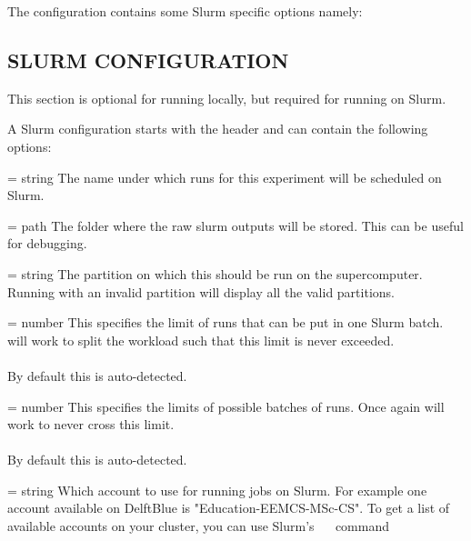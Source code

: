 \documentclass[a4paper,english]{article}
\begin{document}
\begin{adjustwidth}{18pt}{0pt}
      The configuration contains some Slurm specific options namely:

      \subsection{SLURM CONFIGURATION}

          This section is optional for running locally, but required
          for running on Slurm.

          A Slurm configuration starts with the header \Arg{[slurm]}
          and can contain the following options:

          \begin{Description}[Options]\setlength{\itemsep}{0cm}
              \item[\Opt{experiment\_name} = string]
                The name under which runs for this experiment will be scheduled
                on Slurm.
              \item[\Opt{output\_folder} = path]
                The folder where the raw slurm outputs will be stored.
                This can be useful for debugging.
              \item[\Opt{partition} = string]
                The partition on which this should be run on the supercomputer.
                Running    with an invalid partition
                will display all the valid partitions.
              \item[\Opt{array\_size\_limit?} = number]
                This specifies the limit of runs that can be put in one Slurm batch.
                 will work to split the workload such that this limit
                is never exceeded. \\ \\
                By default this is auto-detected.
              \item[\Opt{max\_submit?} = number]
                This specifies the limits of possible batches of runs.
                Once again  will work to never cross this limit. \\ \\
                By default this is auto-detected.
              \item[\Opt{account} = string]
                Which account to use for running jobs on Slurm.
                For example one account available on DelftBlue is "Education-EEMCS-MSc-CS".
                To get a list of available accounts on your cluster,
                you can use Slurm's ~~ command

\end{Description}
\end{adjustwidth}
\end{document}
